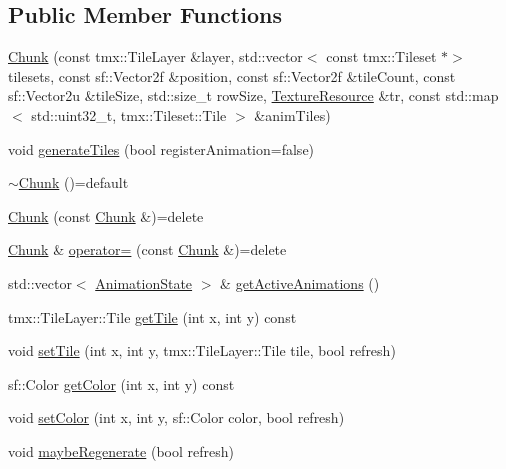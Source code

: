 \subsection*{Public Member Functions}
\begin{DoxyCompactItemize}
\item 
\hyperlink{classMapLayer_1_1Chunk_a793a265040a7e0e117d47463b5d1f762}{Chunk} (const tmx\+::\+Tile\+Layer \&layer, std\+::vector$<$ const tmx\+::\+Tileset $\ast$$>$ tilesets, const sf\+::\+Vector2f \&position, const sf\+::\+Vector2f \&tile\+Count, const sf\+::\+Vector2u \&tile\+Size, std\+::size\+\_\+t row\+Size, \hyperlink{classMapLayer_a64011087426e436e3cb8374570378d68}{Texture\+Resource} \&tr, const std\+::map$<$ std\+::uint32\+\_\+t, tmx\+::\+Tileset\+::\+Tile $>$ \&anim\+Tiles)
\item 
void \hyperlink{classMapLayer_1_1Chunk_aa8e16ad1e2e77a00313c4ed92f0a87b7}{generate\+Tiles} (bool register\+Animation=false)
\item 
\hyperlink{classMapLayer_1_1Chunk_a868f8750a2139ead6a79ae6f228303f5}{$\sim$\+Chunk} ()=default
\item 
\hyperlink{classMapLayer_1_1Chunk_ad135fca4082657b3babebd9c5b3402a8}{Chunk} (const \hyperlink{classMapLayer_1_1Chunk}{Chunk} \&)=delete
\item 
\hyperlink{classMapLayer_1_1Chunk}{Chunk} \& \hyperlink{classMapLayer_1_1Chunk_aad57eee35df69297877377ac64dceb6f}{operator=} (const \hyperlink{classMapLayer_1_1Chunk}{Chunk} \&)=delete
\item 
std\+::vector$<$ \hyperlink{structMapLayer_1_1AnimationState}{Animation\+State} $>$ \& \hyperlink{classMapLayer_1_1Chunk_adc0fdad3f30d7ff327b2a538efc8c949}{get\+Active\+Animations} ()
\item 
tmx\+::\+Tile\+Layer\+::\+Tile \hyperlink{classMapLayer_1_1Chunk_ae70972baf5ed18a69709f180e62f4eb5}{get\+Tile} (int x, int y) const
\item 
void \hyperlink{classMapLayer_1_1Chunk_a557343f1e955e78b6f68623007fb9a7a}{set\+Tile} (int x, int y, tmx\+::\+Tile\+Layer\+::\+Tile tile, bool refresh)
\item 
sf\+::\+Color \hyperlink{classMapLayer_1_1Chunk_aeee5ad34f7c428e1fd290b2a1a695397}{get\+Color} (int x, int y) const
\item 
void \hyperlink{classMapLayer_1_1Chunk_addf26b112e46bc6995f03a886cf46dc8}{set\+Color} (int x, int y, sf\+::\+Color color, bool refresh)
\item 
void \hyperlink{classMapLayer_1_1Chunk_abf755ab4f7b9430aae29a631eb2ee48e}{maybe\+Regenerate} (bool refresh)
$$
\end{DoxyCompactItemize}
